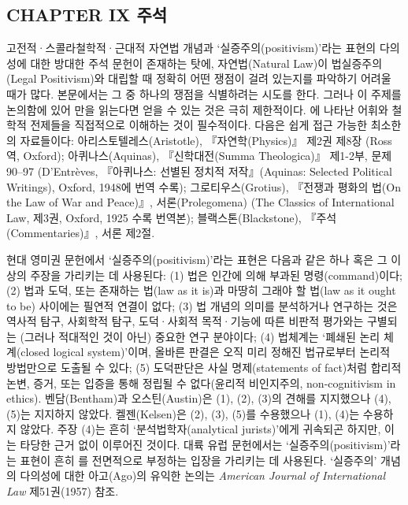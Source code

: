 {\footnotesize

\subsection{CHAPTER IX 주석}\label{chapter-ix-uxc8fcuxc11d}

 고전적·스콜라철학적·근대적 자연법
개념과 `실증주의(positivism)'라는 표현의 다의성에 대한 방대한 주석
문헌이 존재하는 탓에, 자연법(Natural Law)이 법실증주의(Legal
Positivism)와 대립할 때 정확히 어떤 쟁점이 걸려 있는지를 파악하기 어려울
때가 많다. 본문에서는 그 중 하나의 쟁점을 식별하려는 시도를 한다. 그러나
이 주제를 논의함에 있어 만을 읽는다면 얻을 수 있는 것은
극히 제한적이다. 에 나타난 어휘와 철학적
전제들을 직접적으로 이해하는 것이 필수적이다. 다음은 쉽게 접근 가능한
최소한의 자료들이다: 아리스토텔레스(Aristotle), 『자연학(Physics)』
제2권 제8장 (Ross 역, Oxford); 아퀴나스(Aquinas), 『신학대전(Summa
Theologica)』 제1-2부, 문제 90--97 (D'Entrèves, 『아퀴나스: 선별된
정치적 저작』(Aquinas: Selected Political Writings), Oxford, 1948에 번역
수록); 그로티우스(Grotius), 『전쟁과 평화의 법(On the Law of War and
Peace)』, 서론(Prolegomena) (The Classics of International Law, 제3권,
Oxford, 1925 수록 번역본); 블랙스톤(Blackstone), 『주석(Commentaries)』,
서론 제2절.

 현대 영미권 문헌에서
`실증주의(positivism)'라는 표현은 다음과 같은 하나 혹은 그 이상의 주장을
가리키는 데 사용된다: (1) 법은 인간에 의해 부과된 명령(command)이다; (2)
법과 도덕, 또는 존재하는 법(law as it is)과 마땅히 그래야 할 법(law as
it ought to be) 사이에는 필연적 연결이 없다; (3) 법 개념의 의미를
분석하거나 연구하는 것은 역사적 탐구, 사회학적 탐구, 도덕·사회적
목적·기능에 따른 비판적 평가와는 구별되는 (그러나 적대적인 것이 아닌)
중요한 연구 분야이다; (4) 법체계는 `폐쇄된 논리 체계(closed logical
system)'이며, 올바른 판결은 오직 미리 정해진 법규로부터 논리적
방법만으로 도출될 수 있다; (5) 도덕판단은 사실 명제(statements of
fact)처럼 합리적 논변, 증거, 또는 입증을 통해 정립될 수 없다(윤리적
비인지주의, non-cognitivism in ethics). 벤담(Bentham)과 오스틴(Austin)은
(1), (2), (3)의 견해를 지지했으나 (4), (5)는 지지하지 않았다.
켈젠(Kelsen)은 (2), (3), (5)를 수용했으나 (1), (4)는 수용하지 않았다.
주장 (4)는 흔히 `분석법학자(analytical jurists)'에게 귀속되곤 하지만,
이는 타당한 근거 없이 이루어진 것이다. 대륙 유럽 문헌에서는
`실증주의(positivism)'라는 표현이 흔히 를 전면적으로 부정하는 입장을
가리키는 데 사용된다. `실증주의' 개념의 다의성에 대한 아고(Ago)의 유익한
논의는 \emph{American Journal of International Law} 제51권(1957) 참조.

}
